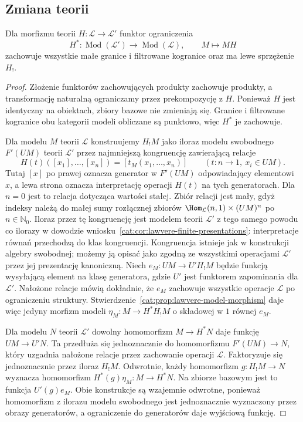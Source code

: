 \subsection{Zmiana teorii}

\begin{stwierdzenie}\label{cat:prop:lawvere-change}
Dla morfizmu teorii $H:\mathcal L\to\mathcal L'$ funktor ograniczenia
\[
 H^*:\operatorname{Mod}(\mathcal L')\longrightarrow\operatorname{Mod}(\mathcal L),
 \qquad M\longmapsto M H
\]
zachowuje wszystkie małe granice i filtrowane kogranice oraz ma lewe sprzężenie $H_!$.
\end{stwierdzenie}
\begin{proof}
Złożenie funktorów zachowujących produkty zachowuje produkty, a transformację naturalną ograniczamy przez prekompozycję z $H$. Ponieważ $H$ jest identyczny na obiektach, zbiory bazowe nie zmieniają się. Granice i filtrowane kogranice obu kategorii modeli obliczane są punktowo, więc $H^*$ je zachowuje.

Dla modelu $M$ teorii $\mathcal L$ konstruujemy $H_! M$ jako iloraz modelu swobodnego $F'(UM)$ teorii $\mathcal L'$ przez najmniejszą kongruencję zawierającą relacje
\[
 H(t)([x_1],\ldots,[x_n])=[t_M(x_1,\ldots,x_n)]
 \qquad(t:n\to1,\ x_i\in UM).
\]
Tutaj $[x]$ po prawej oznacza generator w $F'(UM)$ odpowiadający elementowi $x$, a lewa strona oznacza interpretację operacji $H(t)$ na tych generatorach. Dla $n=0$ jest to relacja dotycząca wartości stałej. Zbiór relacji jest mały, gdyż indeksy należą do małej sumy rozłącznej zbiorów $\Hom_{\mathcal L}(n,1)\times(UM)^n$ po $n\in\mathbb N_0$. Iloraz przez tę kongruencję jest modelem teorii $\mathcal L'$ z tego samego powodu co ilorazy w dowodzie wniosku~\ref{cat:cor:lawvere-finite-presentations}: interpretacje równań przechodzą do klas kongruencji. Kongruencja istnieje jak w konstrukcji algebry swobodnej; możemy ją opisać jako zgodną ze wszystkimi operacjami $\mathcal L'$ przez jej prezentację kanoniczną. Niech $e_M:UM\to U'H_!M$ będzie funkcją wysyłającą element na klasę generatora, gdzie $U'$ jest funktorem zapominania dla $\mathcal L'$. Nałożone relacje mówią dokładnie, że $e_M$ zachowuje wszystkie operacje $\mathcal L$ po ograniczeniu struktury. Stwierdzenie~\ref{cat:prop:lawvere-model-morphism} daje więc jedyny morfizm modeli $\eta_M:M\to H^*H_!M$ o składowej w $1$ równej $e_M$.

Dla modelu $N$ teorii $\mathcal L'$ dowolny homomorfizm $M\to H^*N$ daje funkcję $UM\to U'N$. Ta przedłuża się jednoznacznie do homomorfizmu $F'(UM)\to N$, który uzgadnia nałożone relacje przez zachowanie operacji $\mathcal L$. Faktoryzuje się jednoznacznie przez iloraz $H_!M$. Odwrotnie, każdy homomorfizm $g:H_!M\to N$ wyznacza homomorfizm $H^*(g)\eta_M:M\to H^*N$. Na zbiorze bazowym jest to funkcja $U'(g)e_M$. Obie konstrukcje są wzajemnie odwrotne, ponieważ homomorfizm z ilorazu modelu swobodnego jest jednoznacznie wyznaczony przez obrazy generatorów, a ograniczenie do generatorów daje wyjściową funkcję.


\end{proof}

